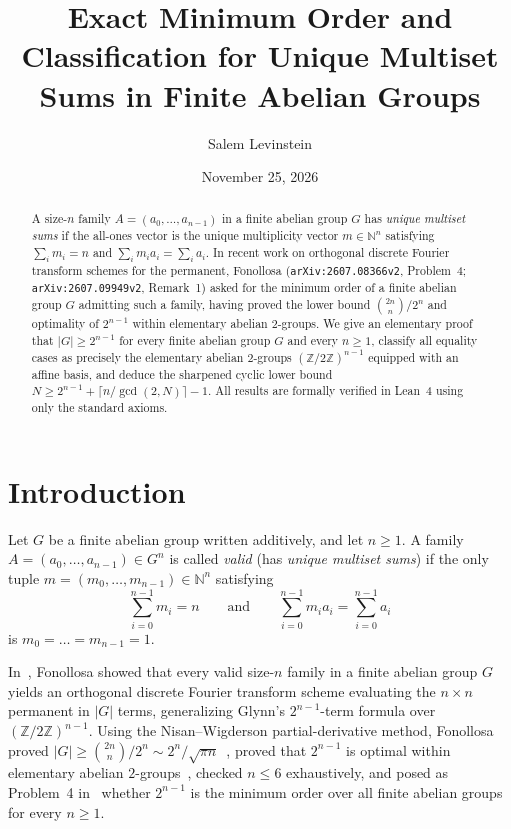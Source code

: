 \documentclass[11pt]{article}
\title{Exact Minimum Order and Classification for Unique Multiset Sums in Finite Abelian Groups}
\author{Salem Levinstein}
\date{November 25, 2026}
\begin{document}
\maketitle

\begin{abstract}
A size-$n$ family $A = (a_0, \dots, a_{n-1})$ in a finite abelian group $G$ has \emph{unique multiset sums} if the all-ones vector is the unique multiplicity vector $m \in \mathbb{N}^n$ satisfying $\sum_i m_i = n$ and $\sum_i m_i a_i = \sum_i a_i$. In recent work on orthogonal discrete Fourier transform schemes for the permanent, Fonollosa (\texttt{arXiv:2607.08366v2}, Problem~4; \texttt{arXiv:2607.09949v2}, Remark~1) asked for the minimum order of a finite abelian group $G$ admitting such a family, having proved the lower bound $\binom{2n}{n}/2^n$ and optimality of $2^{n-1}$ within elementary abelian $2$-groups. We give an elementary proof that $|G| \ge 2^{n-1}$ for every finite abelian group $G$ and every $n \ge 1$, classify all equality cases as precisely the elementary abelian $2$-groups $(\mathbb{Z}/2\mathbb{Z})^{n-1}$ equipped with an affine basis, and deduce the sharpened cyclic lower bound $N \ge 2^{n-1} + \lceil n/\gcd(2,N) \rceil - 1$. All results are formally verified in Lean~4 using only the standard axioms.
\end{abstract}

\section{Introduction}
Let $G$ be a finite abelian group written additively, and let $n \ge 1$. A family $A = (a_0, \dots, a_{n-1}) \in G^n$ is called \emph{valid} (has \emph{unique multiset sums}) if the only tuple $m = (m_0, \dots, m_{n-1}) \in \mathbb{N}^n$ satisfying
\[
\sum_{i=0}^{n-1} m_i = n \qquad \text{and} \qquad \sum_{i=0}^{n-1} m_i a_i = \sum_{i=0}^{n-1} a_i
\]
is $m_0 = \dots = m_{n-1} = 1$.

In~\cite{fonollosa2026minmod,fonollosa2026permanent}, Fonollosa showed that every valid size-$n$ family in a finite abelian group $G$ yields an orthogonal discrete Fourier transform scheme evaluating the $n \times n$ permanent in $|G|$ terms, generalizing Glynn's $2^{n-1}$-term formula over $(\mathbb{Z}/2\mathbb{Z})^{n-1}$. Using the Nisan--Wigderson partial-derivative method, Fonollosa proved $|G| \ge \binom{2n}{n}/2^n \sim 2^n/\sqrt{\pi n}$~\cite[Corollary~1]{fonollosa2026permanent}, proved that $2^{n-1}$ is optimal within elementary abelian $2$-groups~\cite[Proposition~2]{fonollosa2026minmod}, checked $n \le 6$ exhaustively, and posed as Problem~4 in~\cite[\S 8]{fonollosa2026minmod} whether $2^{n-1}$ is the minimum order over all finite abelian groups for every $n \ge 1$.
\end{document}
